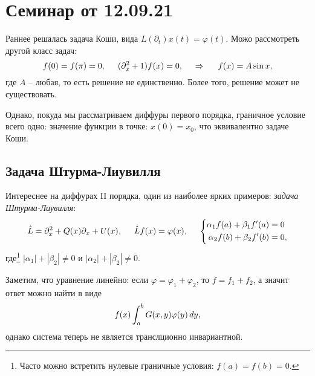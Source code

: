 \section{Семинар от 12.09.21}

Раннее решалась задача Коши, вида $L(\partial_t) x(t) = \varphi(t)$. Можо рассмотреть другой класс задач:
\begin{equation*}
    f(0) = f(\pi) = 0,
    \hspace{5 mm} 
    (\partial_x^2 + 1) f(x) = 0,
    \hspace{0.5cm} \Rightarrow \hspace{0.5cm}
    f(x) = A \sin x,
\end{equation*}
где $A$ -- любая, то есть решение не единственно. Более того, решение может не существовать. 

Однако, покуда мы рассматриваем диффуры первого порядка, граничное условие всего одно: значение функции в точке: $x(0) = x_0$, что эквивалентно задаче Коши. 


\subsection{Задача Штурма-Лиувилля}


Интереснее на диффурах II порядка, один из наиболее ярких примеров: \textit{задача Штурма-Лиувилля}:
\begin{equation*}
    \hat{L} = \partial_x^2 + Q(x) \partial_x + U(x),
    \hspace{5 mm} 
    \hat{L} f(x) = \varphi(x),
    \hspace{5 mm} 
    \left\{\begin{aligned}
        \alpha_1 f(a) + \beta_1 f'(a) &= 0 \\
        \alpha_2 f(b) + \beta_2 f'(b) &= 0,
    \end{aligned}\right.
\end{equation*}
где\footnote{
    Часто можно встретить нулевые граничные условия: $f(a) = f(b) = 0$. 
}  $|\alpha_1| + |\beta_2| \neq 0$ и $|\alpha_2| + |\beta_2| \neq 0$.

Заметим, что уравнение линейно: если $\varphi = \varphi_1 + \varphi_2$, то $f = f_1 + f_2$, а значит ответ можно найти в виде
\begin{equation*}
    f(x) \int_{a}^{b} G(x,y) \varphi(y) \, d y,
\end{equation*}
однако система теперь не является транслционно инвариантной. 


